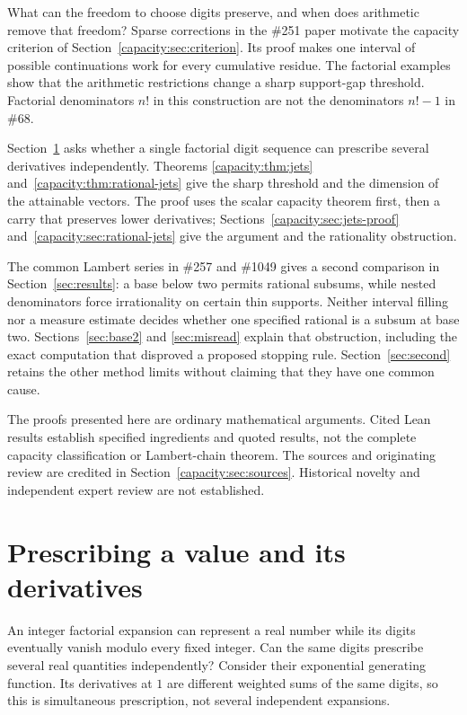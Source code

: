 \documentclass[11pt]{article}
\begin{document}
What can the freedom to choose digits preserve, and when does arithmetic
remove that freedom? Sparse corrections in the \#251 paper motivate the
capacity criterion of Section~\ref{capacity:sec:criterion}. Its proof makes
one interval of possible continuations work for every cumulative residue.
The factorial examples show that the arithmetic restrictions change a sharp
support-gap threshold. Factorial denominators $n!$ in this construction are
not the denominators $n!-1$ in \#68.

Section~\ref{capacity:sec:jets-intro} asks whether a single factorial digit
sequence can prescribe several derivatives independently. Theorems
\ref{capacity:thm:jets} and~\ref{capacity:thm:rational-jets} give the sharp
threshold and the dimension of the attainable vectors. The proof uses the
scalar capacity theorem first, then a carry that preserves lower derivatives;
Sections~\ref{capacity:sec:jets-proof} and~\ref{capacity:sec:rational-jets}
give the argument and the rationality obstruction.

The common Lambert series in \#257 and \#1049 gives a second comparison in
Section~\ref{sec:results}: a base below two permits rational subsums, while
nested denominators force irrationality on certain thin supports. Neither
interval filling nor a measure estimate decides whether one specified
rational is a subsum at base two. Sections~\ref{sec:base2} and
\ref{sec:misread} explain that obstruction, including the exact computation
that disproved a proposed stopping rule. Section~\ref{sec:second} retains the
other method limits without claiming that they have one common cause.

The proofs presented here are ordinary mathematical arguments. Cited Lean
results establish specified ingredients and quoted results, not the complete
capacity classification or Lambert-chain theorem. The sources and originating
review are credited in Section~\ref{capacity:sec:sources}. Historical novelty
and independent expert review are not established.

\section{Prescribing a value and its derivatives}\label{capacity:sec:jets-intro}
An integer factorial expansion can represent a real number while its digits
eventually vanish modulo every fixed integer. Can the same digits prescribe
several real quantities independently? Consider their exponential generating
function. Its derivatives at $1$ are different weighted sums of the same
digits, so this is simultaneous prescription, not several independent expansions.
\end{document}
